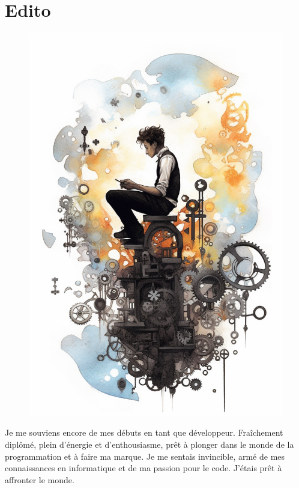 \part*{Edito}

\begin{figure}[H]
    \center
    \includegraphics[keepaspectratio, width=\textwidth]{images/19e9e263-d40a-4bd0-bf6d-5aded7ffb396.png}
\end{figure}

Je me souviens encore de mes débuts en tant que développeur. Fraîchement diplômé, plein d'énergie et d'enthousiasme, prêt à plonger dans le monde de la programmation et à faire ma marque. Je me sentais invincible, armé de mes connaissances en informatique et de ma passion pour le code. J'étais prêt à affronter le monde.

